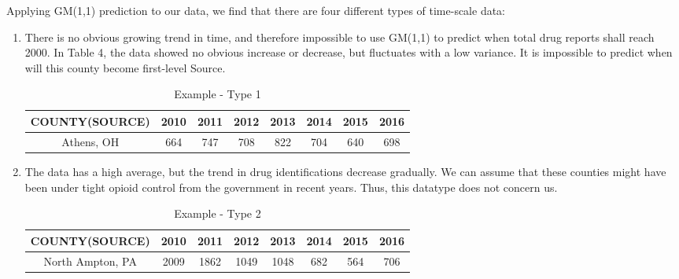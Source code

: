 Applying GM(1,1) prediction to our data, we find that there are four different types of time-scale data:
\begin{enumerate}
	\item There is no obvious growing trend in time, and therefore impossible to use GM(1,1) to predict when total drug reports shall reach 2000. In Table 4, the data showed no obvious increase or decrease, but fluctuates with a low variance. It is impossible to predict when will this county become first-level Source.
	\begin{table}[H]
		\centering
		\begin{tabular}{|c|c|c|c|c|c|c|c|}
			\hline
			\rowcolor[HTML]{656565} 
			 {\color[HTML]{FFFFFF} \textbf{COUNTY(SOURCE)}} & {\color[HTML]{FFFFFF} \textbf{2010}} & {\color[HTML]{FFFFFF} \textbf{2011}} & {\color[HTML]{FFFFFF} \textbf{2012}} & {\color[HTML]{FFFFFF} \textbf{2013}} & {\color[HTML]{FFFFFF} \textbf{2014}} & {\color[HTML]{FFFFFF} \textbf{2015}} & {\color[HTML]{FFFFFF} \textbf{2016}}\\ \hline
			Athens, OH & 664	& 747 & 708 & 822 & 704	& 640 &	698 \\ \hline
		\end{tabular}
		\centering
		\caption{Example - Type 1 }
	\end{table}

	\item The data has a high average, but the trend in drug identifications decrease gradually. We can assume that these counties might have been under tight opioid control from the government in recent years. Thus, this datatype does not concern us.
	\begin{table}[H]
		\centering
		\begin{tabular}{|c|c|c|c|c|c|c|c|}
			\hline
			\rowcolor[HTML]{656565} 
			{\color[HTML]{FFFFFF} \textbf{COUNTY(SOURCE)}} & {\color[HTML]{FFFFFF} \textbf{2010}} & {\color[HTML]{FFFFFF} \textbf{2011}} & {\color[HTML]{FFFFFF} \textbf{2012}} & {\color[HTML]{FFFFFF} \textbf{2013}} & {\color[HTML]{FFFFFF} \textbf{2014}} & {\color[HTML]{FFFFFF} \textbf{2015}} & {\color[HTML]{FFFFFF} \textbf{2016}}\\ \hline
			North Ampton, PA & 2009&1862&1049&1048&682&564&706 \\ \hline
		\end{tabular}
		\centering
		\caption{Example - Type 2}
	\end{table}
	

\end{enumerate}
